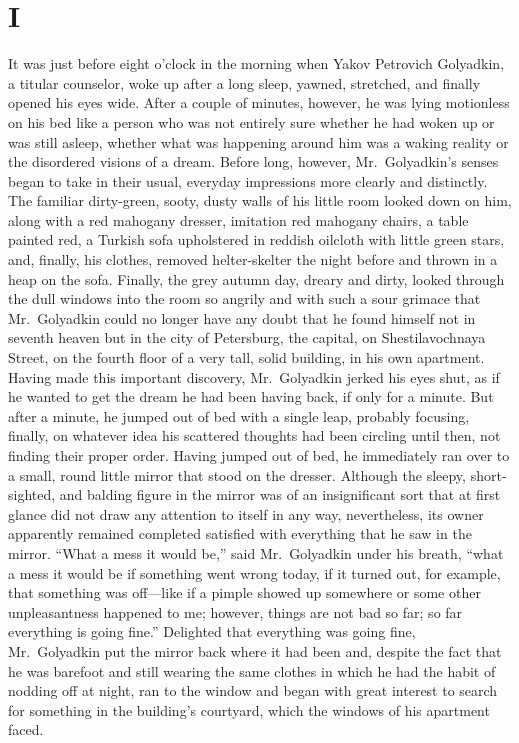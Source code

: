 \chapter*{I}

It was just before eight o'clock in the morning when Yakov Petrovich Golyadkin, a titular counselor, woke up after a long sleep, yawned, stretched, and finally opened his eyes wide. After a couple of minutes, however, he was lying motionless on his bed like a person who was not entirely sure whether he had woken up or was still asleep, whether what was happening around him was a waking reality or the disordered visions of a dream. Before long, however, Mr.~Golyadkin's senses began to take in their usual, everyday impressions more clearly and distinctly. The familiar dirty-green, sooty, dusty walls of his little room looked down on him, along with a red mahogany dresser, imitation red mahogany chairs, a table painted red, a Turkish sofa upholstered in reddish oilcloth with little green stars, and, finally, his clothes, removed helter-skelter the night before and thrown in a heap on the sofa. Finally, the grey autumn day, dreary and dirty, looked through the dull windows into the room so angrily and with such a sour grimace that Mr.~Golyadkin could no longer have any doubt that he found himself not in seventh heaven but in the city of Petersburg, the capital, on Shestilavochnaya Street, on the fourth floor of a very tall, solid building, in his own apartment. Having made this important discovery, Mr.~Golyadkin jerked his eyes shut, as if he wanted to get the dream he had been having back, if only for a minute. But after a minute, he jumped out of bed with a single leap, probably focusing, finally, on whatever idea his scattered thoughts had been circling until then, not finding their proper order. Having jumped out of bed, he immediately ran over to a small, round little mirror that stood on the dresser. Although the sleepy, short-sighted, and balding figure in the mirror was of an insignificant sort that at first glance did not draw any attention to itself in any way, nevertheless, its owner apparently remained completed satisfied with everything that he saw in the mirror. ``What a mess it would be,'' said Mr.~Golyadkin under his breath, ``what a mess it would be if something went wrong today, if it turned out, for example, that something was off---like if a pimple showed up somewhere or some other unpleasantness happened to me; however, things are not bad so far; so far everything is going fine.'' Delighted that everything was going fine, Mr.~Golyadkin put the mirror back where it had been and, despite the fact that he was barefoot and still wearing the same clothes in which he had the habit of nodding off at night, ran to the window and began with great interest to search for something in the building's courtyard, which the windows of his apartment faced. %

